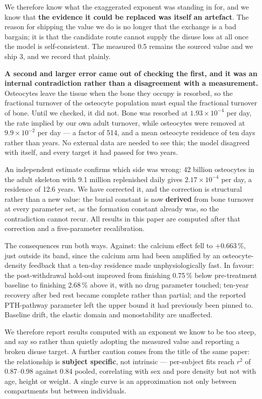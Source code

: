 \documentclass[10pt,letterpaper]{article}
\begin{document}
We therefore know what the exaggerated exponent was standing in for, and we know
that \textbf{the evidence it could be replaced was itself an artefact}. The
reason for shipping the value we do is no longer that the exchange is a bad
bargain; it is that the candidate route cannot supply the disuse loss at all
once the model is self-consistent. The measured 0.5 remains the sourced value and
we ship 3, and we record that plainly.

\textbf{A second and larger error came out of checking the first, and it was an
internal contradiction rather than a disagreement with a measurement.}
Osteocytes leave the tissue when the bone they occupy is resorbed, so the
fractional turnover of the osteocyte population must equal the fractional
turnover of bone. Until we checked, it did not. Bone was resorbed at
$1.93\times10^{-4}$ per day, the rate implied by our own adult turnover, while
osteocytes were removed at $9.9\times10^{-2}$ per day --- a factor of 514, and a
mean osteocyte residence of ten days rather than years. No external data are
needed to see this; the model disagreed with itself, and every target it had
passed for two years.

An independent estimate confirms which side was wrong: 42 billion osteocytes in
the adult skeleton with 9.1 million replenished daily \cite{buenzli2015} gives
$2.17\times10^{-4}$ per day, a residence of 12.6 years. We have corrected it,
and the correction is structural rather than a new value: the burial constant is
now \textbf{derived} from bone turnover at every parameter set, as the formation
constant already was, so the contradiction cannot recur. All results in this
paper are computed after that correction and a five-parameter recalibration.

The consequences run both ways. Against: the calcium effect fell to
$+0.663$\,\%, just outside its band, since the calcium arm had been amplified by
an osteocyte-density feedback that a ten-day residence made unphysiologically
fast. In favour: the post-withdrawal hold-out improved from finishing 0.75\,\%
below pre-treatment baseline to finishing 2.68\,\% above it, with no drug
parameter touched; ten-year recovery after bed rest became complete rather than
partial; and the reported PTH-pathway parameter left the upper bound it had
previously been pinned to. Baseline drift, the elastic domain and monostability
are unaffected.

We therefore report results computed with an exponent we know to be too steep,
and say so rather than quietly adopting the measured value and reporting a
broken disuse target. A further caution comes from the title of the same paper:
the relationship is \textbf{subject specific}, not intrinsic --- per-subject fits
reach $r^2$ of 0.87--0.98 against 0.84 pooled, correlating with sex and pore
density but not with age, height or weight. A single curve is an approximation
not only between compartments but between individuals.
\end{document}
